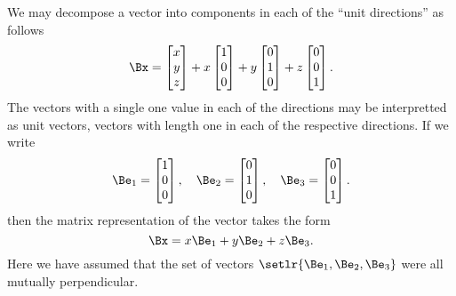 We may decompose a vector into components in each of the ``unit directions'' as follows
\begin{dmath}\label{eqn:multivector:160}
\Bx =
\begin{bmatrix}
x \\
y \\
z
\end{bmatrix}
+
x
\begin{bmatrix}
1 \\
0 \\
0 \\
\end{bmatrix}
+
y
\begin{bmatrix}
0 \\
1 \\
0 \\
\end{bmatrix}
+
z
\begin{bmatrix}
0 \\
0 \\
1 \\
\end{bmatrix}.
\end{dmath}
The vectors with a single one value in each of the directions may be interpretted as unit vectors, vectors with length one in each of the respective directions.
If we write
\begin{equation}\label{eqn:prerequisites:20}
\Be_1 =
\begin{bmatrix}
1 \\
0 \\
0 \\
\end{bmatrix},\quad
\Be_2 =
\begin{bmatrix}
0 \\
1 \\
0 \\
\end{bmatrix},\quad
\Be_3 =
\begin{bmatrix}
0 \\
0 \\
1 \\
\end{bmatrix}.
\end{equation}
then the matrix representation of the vector takes the form
\begin{dmath}\label{eqn:prerequisites:40}
\Bx = x \Be_1 + y \Be_2 + z \Be_3.
\end{dmath}
Here we have assumed that the set of vectors
\( \setlr{ \Be_1, \Be_2, \Be_3 } \) were all mutually perpendicular.
